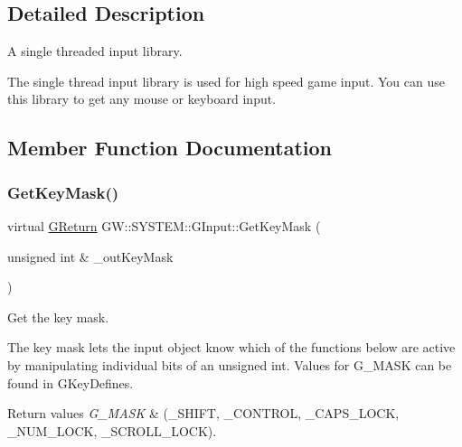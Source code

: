 \subsection{Detailed Description}
A single threaded input library. 

The single thread input library is used for high speed game input. You can use this library to get any mouse or keyboard input. 

\subsection{Member Function Documentation}
\mbox{\label{classGW_1_1SYSTEM_1_1GInput_a448ee14346a393286b0dfe1dc61ca93d}} 
\subsubsection{\texorpdfstring{Get\+Key\+Mask()}{GetKeyMask()}}
{\footnotesize\ttfamily virtual \hyperlink{namespaceGW_a67a839e3df7ea8a5c5686613a7a3de21}{G\+Return} G\+W\+::\+S\+Y\+S\+T\+E\+M\+::\+G\+Input\+::\+Get\+Key\+Mask (\begin{DoxyParamCaption}\item[{unsigned int \&}]{\+\_\+out\+Key\+Mask }\end{DoxyParamCaption})\hspace{0.3cm}{\ttfamily [pure virtual]}}



Get the key mask. 

The key mask lets the input object know which of the functions below are active by manipulating individual bits of an unsigned int. Values for G\+\_\+\+M\+A\+SK can be found in G\+Key\+Defines.


\begin{DoxyRetVals}{Return values}
{\em G\+\_\+\+M\+A\+SK} & (\+\_\+\+S\+H\+I\+FT, \+\_\+\+C\+O\+N\+T\+R\+OL, \+\_\+\+C\+A\+P\+S\+\_\+\+L\+O\+CK, \+\_\+\+N\+U\+M\+\_\+\+L\+O\+CK, \+\_\+\+S\+C\+R\+O\+L\+L\+\_\+\+L\+O\+CK). \\
\hline
\end{DoxyRetVals}
\mbox{\label{classGW_1_1SYSTEM_1_1GInput_a775fca7ad71371f369e3ad69fb32603a}} 
